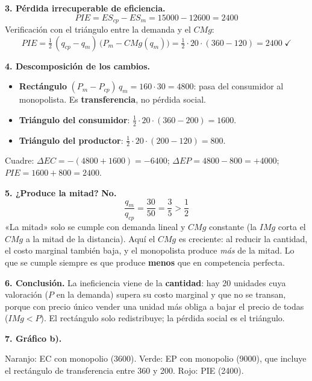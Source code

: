 \documentclass[11pt]{article}
\begin{document}
\textbf{3. Pérdida irrecuperable de eficiencia.}
\[
PIE = ES_{cp} - ES_m = 15000 - 12600 = \boxed{2400}
\]
Verificación con el triángulo entre la demanda y el $CMg$:
\[
PIE = \tfrac12\,(q_{cp} - q_m)\,\big(P_m - CMg(q_m)\big) = \tfrac12\cdot 20\cdot(360 - 120) = 2400 \;\checkmark
\]

\textbf{4. Descomposición de los cambios.}
\begin{itemize}
\item \textbf{Rectángulo} $(P_m - P_{cp})\,q_m = 160\cdot 30 = 4800$: pasa del consumidor al monopolista. Es \textbf{transferencia}, no pérdida social.
\item \textbf{Triángulo del consumidor}: $\tfrac12\cdot 20\cdot(360 - 200) = 1600$.
\item \textbf{Triángulo del productor}: $\tfrac12\cdot 20\cdot(200 - 120) = 800$.
\end{itemize}
Cuadre: $\Delta EC = -(4800 + 1600) = -6400$; \quad $\Delta EP = 4800 - 800 = +4000$; \quad $PIE = 1600 + 800 = 2400$.

\textbf{5. ¿Produce la mitad?} \textbf{No.}
\[
\frac{q_m}{q_{cp}} = \frac{30}{50} = \frac{3}{5} > \frac12
\]
«La mitad» solo se cumple con demanda lineal y $CMg$ constante (la $IMg$ corta el $CMg$ a la mitad de la distancia). Aquí el $CMg$ es creciente: al reducir la cantidad, el costo marginal también baja, y el monopolista produce \emph{más} de la mitad. Lo que se cumple siempre es que produce \textbf{menos} que en competencia perfecta.

\textbf{6. Conclusión.} La ineficiencia viene de la \textbf{cantidad}: hay 20 unidades cuya valoración ($P$ en la demanda) supera su costo marginal y que no se transan, porque con precio único vender una unidad más obliga a bajar el precio de todas ($IMg < P$). El rectángulo solo redistribuye; la pérdida social es el triángulo.

\textbf{7. Gráfico b).}

\begin{center}
\end{center}
{\small Naranjo: EC con monopolio (3600). Verde: EP con monopolio (9000), que incluye el rectángulo de transferencia entre 360 y 200. Rojo: PIE (2400).}
\end{document}
